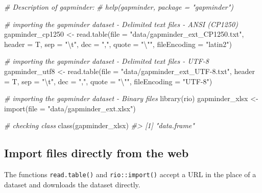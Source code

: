 \documentclass[
]{book}
\newenvironment{Shaded}{\begin{snugshade}}{\end{snugshade}}
\newcommand{\AttributeTok}[1]{\textcolor[rgb]{0.77,0.63,0.00}{#1}}
\newcommand{\CommentTok}[1]{\textcolor[rgb]{0.56,0.35,0.01}{\textit{#1}}}
\newcommand{\FunctionTok}[1]{\textcolor[rgb]{0.00,0.00,0.00}{#1}}
\newcommand{\NormalTok}[1]{#1}
\newcommand{\OtherTok}[1]{\textcolor[rgb]{0.56,0.35,0.01}{#1}}
\newcommand{\SpecialCharTok}[1]{\textcolor[rgb]{0.00,0.00,0.00}{#1}}
\newcommand{\StringTok}[1]{\textcolor[rgb]{0.31,0.60,0.02}{#1}}
\begin{document}
\begin{Shaded}
\begin{Highlighting}[]
\CommentTok{\# Description of gapminder:}
\CommentTok{\# help(gapminder, package = "gapminder")}

\CommentTok{\# importing the gapminder dataset {-} Delimited text files {-} ANSI (CP1250)}
\NormalTok{gapminder\_cp1250 }\OtherTok{\textless{}{-}} \FunctionTok{read.table}\NormalTok{(}\AttributeTok{file =} \StringTok{"data/gapminder\_ext\_CP1250.txt"}\NormalTok{, }\AttributeTok{header =}\NormalTok{ T, }\AttributeTok{sep =} \StringTok{"}\SpecialCharTok{\textbackslash{}t}\StringTok{"}\NormalTok{, }\AttributeTok{dec =} \StringTok{","}\NormalTok{, }\AttributeTok{quote =} \StringTok{"}\SpecialCharTok{\textbackslash{}"}\StringTok{"}\NormalTok{, }\AttributeTok{fileEncoding =} \StringTok{"latin2"}\NormalTok{)}

\CommentTok{\# importing the gapminder dataset {-} Delimited text files {-} UTF{-}8}
\NormalTok{gapminder\_utf8 }\OtherTok{\textless{}{-}} \FunctionTok{read.table}\NormalTok{(}\AttributeTok{file =} \StringTok{"data/gapminder\_ext\_UTF{-}8.txt"}\NormalTok{, }\AttributeTok{header =}\NormalTok{ T, }\AttributeTok{sep =} \StringTok{"}\SpecialCharTok{\textbackslash{}t}\StringTok{"}\NormalTok{, }\AttributeTok{dec =} \StringTok{","}\NormalTok{, }\AttributeTok{quote =} \StringTok{"}\SpecialCharTok{\textbackslash{}"}\StringTok{"}\NormalTok{, }\AttributeTok{fileEncoding =} \StringTok{"UTF{-}8"}\NormalTok{)}

\CommentTok{\# importing the gapminder dataset {-} Binary files}
\FunctionTok{library}\NormalTok{(rio)}
\NormalTok{gapminder\_xlsx }\OtherTok{\textless{}{-}} \FunctionTok{import}\NormalTok{(}\AttributeTok{file =} \StringTok{"data/gapminder\_ext.xlsx"}\NormalTok{)}

\CommentTok{\# checking class}
\FunctionTok{class}\NormalTok{(gapminder\_xlsx)}
\CommentTok{\#\textgreater{} [1] "data.frame"}
\end{Highlighting}
\end{Shaded}

\hypertarget{import-files-directly-from-the-web}{%
\subsection{Import files directly from the web}\label{import-files-directly-from-the-web}}

The functions \texttt{read.table()} and \texttt{rio::import()} accept a URL in the place of a dataset and downloads the dataset directly.
\end{document}
